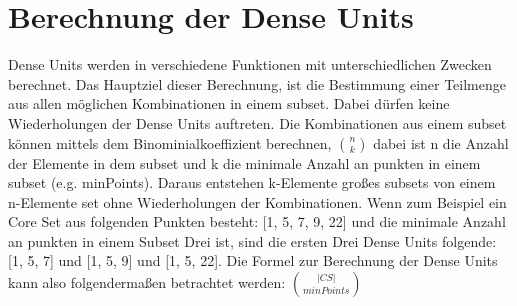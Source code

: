 \section{Berechnung der Dense Units}
\label{sec:chap3}

Dense Units werden in verschiedene Funktionen mit unterschiedlichen Zwecken berechnet. Das Hauptziel dieser Berechnung, ist die Bestimmung einer Teilmenge aus allen möglichen Kombinationen in einem subset. Dabei dürfen keine Wiederholungen der Dense Units auftreten. Die Kombinationen aus einem subset können mittels dem Binominialkoeffizient berechnen, $ \binom{n}{k} $ dabei ist n die Anzahl der Elemente in dem subset und k die minimale Anzahl an punkten in einem subset (e.g. minPoints). Daraus entstehen k-Elemente großes subsets von einem n-Elemente set ohne Wiederholungen der Kombinationen.
Wenn zum Beispiel ein Core Set aus folgenden Punkten besteht: [1, 5, 7, 9, 22] und die minimale Anzahl an punkten in einem Subset Drei ist, sind die ersten Drei Dense Units folgende: [1, 5, 7] und [1, 5, 9] und [1, 5, 22]. Die Formel zur Berechnung der Dense Units kann also folgendermaßen betrachtet werden: 
$ \binom{|CS|}{minPoints}$
